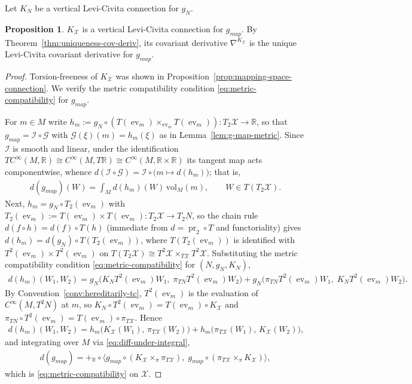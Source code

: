 \documentclass{amsart}
\newcommand{\R}{\mathbb{R}}
\newcommand{\vol}{\mathrm{vol}}
\newcommand{\X}{\mathcal{X}}
\DeclareMathOperator{\pr}{pr}
\DeclareMathOperator{\evl}{ev}
\theoremstyle{definition}
\newtheorem{prop}[thm]{Proposition}
\begin{document}
Let $K_N$ be a vertical Levi-Civita connection for $g_N$.

\begin{prop}\label{prop:mapping-space-levi-civita}
   $K_{\X}$ is a vertical Levi-Civita connection for $g_{\mathit{map}}$.
   By Theorem~\ref{thm:uniqueness-cov-deriv}, its covariant derivative $\nabla^{K_{\X}}$ is the unique Levi-Civita covariant derivative for $g_{\mathit{map}}$.
\end{prop}

\begin{proof}
   Torsion-freeness of $K_{\X}$ was shown in Proposition~\ref{prop:mapping-space-connection}. We verify the metric
   compatibility condition \eqref{eq:metric-compatibility} for $g_{\mathit{map}}$.

   For $m \in M$ write
   $h_m := g_N \circ (T(\evl_m) \times_{\evl_m} T(\evl_m))
   \colon T_2\X \to \R$, so that
   $g_{\mathit{map}} = \mathcal{I} \circ \mathcal{G}$ with
   $\mathcal{G}(\xi)(m) = h_m(\xi)$ as in Lemma~\ref{lem:g-map-metric}.
   Since $\mathcal{I}$ is smooth and linear, under the identification
   $TC^\infty(M, \R) \cong C^\infty(M, T\R) \cong C^\infty(M, \R \times \R)$
   its tangent map acts componentwise, whence
   $d(\mathcal{I} \circ \mathcal{G})
    = \mathcal{I} \circ \bigl(m \mapsto d(h_m)\bigr)$; that is,
   \begin{align}\label{eq:diff-under-integral}
     d(g_{\mathit{map}})(W)
       = \int_M d(h_m)(W)\, \vol_M(m),
     \qquad W \in T(T_2\X).
   \end{align}
   Next, $h_m = g_N \circ T_2(\evl_m)$ with
   $T_2(\evl_m) := T(\evl_m) \times T(\evl_m) \colon T_2\X \to T_2N$, so the
   chain rule $d(f \circ h) = d(f) \circ T(h)$ (immediate from
   $d = \pr_2 \circ T$ and functoriality) gives
   $d(h_m) = d(g_N) \circ T(T_2(\evl_m))$, where $T(T_2(\evl_m))$ is
   identified with $T^2(\evl_m) \times T^2(\evl_m)$ on
   $T(T_2\X) \cong T^2\X \times_{T\X} T^2\X$. Substituting the metric
   compatibility condition \eqref{eq:metric-compatibility} for $(N, g_N, K_N)$,
   \begin{align*}
     d(h_m)(W_1, W_2)
       = g_N\bigl(K_N T^2(\evl_m) W_1,\; \pi_{TN} T^2(\evl_m) W_2\bigr)
       + g_N\bigl(\pi_{TN} T^2(\evl_m) W_1,\; K_N T^2(\evl_m) W_2\bigr).
   \end{align*}
   By Convention~\ref{conv:hereditarily-tc}, $T^2(\evl_m)$ is the evaluation
   of $C^\infty(M, T^2N)$ at $m$, so
   $K_N \circ T^2(\evl_m) = T(\evl_m) \circ K_{\X}$ and
   $\pi_{TN} \circ T^2(\evl_m) = T(\evl_m) \circ \pi_{T\X}$. Hence
   \begin{align*}
     d(h_m)(W_1, W_2)
       = h_m\bigl(K_{\X}(W_1),\, \pi_{T\X}(W_2)\bigr)
       + h_m\bigl(\pi_{T\X}(W_1),\, K_{\X}(W_2)\bigr),
   \end{align*}
   and integrating over $M$ via \eqref{eq:diff-under-integral},
   \begin{align*}
     d(g_{\mathit{map}})
       = +_{\R} \circ
         \langle g_{\mathit{map}} \circ (K_{\X} \times_{\pi} \pi_{T\X}),\;
                g_{\mathit{map}} \circ (\pi_{T\X} \times_{\pi} K_{\X}) \rangle,
   \end{align*}
   which is \eqref{eq:metric-compatibility} on $\X$.
\end{proof}
\end{document}
